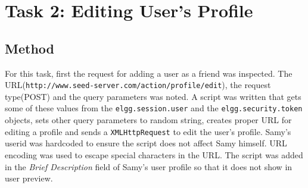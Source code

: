 \documentclass[a4paper, 11pt, oneside]{article} %
\begin{document}
\section{Task 2: Editing User's Profile}
\subsection{Method}
For this task, first the request for adding a user as a friend was inspected. The URL(\texttt{http://www.seed-server.com/action/profile/edit}), the request type(POST) and the query parameters was noted. A script was written that gets some of these values from the \texttt{elgg.session.user} and the \texttt{elgg.security.token} objects, sets other query parameters to random string, creates proper URL for editing a profile and sends a \texttt{XMLHttpRequest} to edit the user's profile. Samy's userid was hardcoded to ensure the script does not affect Samy himself. URL encoding was used to escape special characters in the URL. The script was added in the \textit{Brief Description} field of Samy's user profile so that it does not show in user preview.
\end{document}
